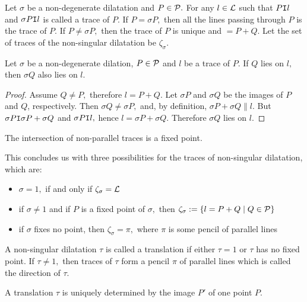\begin{definition}
    Let $\sigma$ be a non-degenerate dilatation and $P \in \mathcal{P}.$ For any $l \in \mathcal{L}$ such that $P \texttt{I} l$ and $\sigma P \texttt{I} l$ is called a trace of $P.$ If $P = \sigma P,$ then all the lines passing through $P$ is the trace of $P.$ If $P \neq \sigma P,$ then the trace of $P$ is unique and $=P+Q.$ Let the set of traces of the non-singular dilatation be $\zeta_\sigma.$
\end{definition}
\begin{theorem}
    Let $\sigma$ be a non-degenerate dilation, $P \in \mathcal{P}$ and $l$ be a trace of $P.$ If $Q$ lies on $l,$ then $\sigma Q$ also lies on $l$. 
\end{theorem}
\begin{proof}
    Assume $Q \neq P,$ therefore $l=P+Q.$ Let $\sigma P$ and $\sigma Q$ be the images of $P$ and $Q$, respectively. Then $\sigma Q \neq \sigma P,$ and, by definition, $\sigma P + \sigma Q \parallel l.$ But $\sigma P\texttt{I} \sigma P+ \sigma Q$ and $ \sigma P \texttt{I} l,$ hence $l=\sigma P+ \sigma Q.$ Therefore $\sigma Q$ lies on $l.$
\end{proof}
\begin{coro}
    The intersection of non-parallel traces is a fixed point.
\end{coro}
This concludes us with three possibilities for the traces of non-singular dilatation, which are:
\begin{itemize}
    \item $\sigma=1,$ if and only if $\zeta_\sigma = \mathcal{L}$
    \item if $\sigma \neq 1$ and if $P$ is a fixed point of $\sigma,$ then $\zeta_\sigma := \{ l=P+Q \; | \;Q \in \mathcal{P}\}$ 
    \item if $\sigma$ fixes no point, then $\zeta_\sigma = \pi,$ where $\pi$ is some pencil of parallel lines
\end{itemize}

\begin{definition}
    A non-singular dilatation $\tau$ is called a translation if either $\tau = 1$ or $\tau$ has no fixed point. If $\tau \neq 1,$ then traces of $\tau$ form a pencil $\pi$ of parallel lines which is called the direction of $\tau.$
\end{definition}

\begin{theorem}
    A translation $\tau$ is uniquely determined by the image $P'$ of one point $P.$
\end{theorem}

